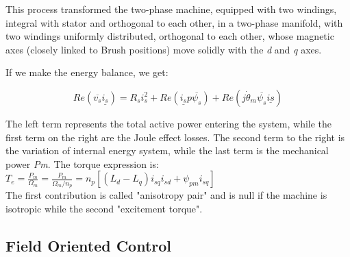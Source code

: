 \documentclass[12pt]{article}
\begin{document}
This process transformed the two-phase machine, equipped with two windings, integral with stator and orthogonal to each other, in a two-phase manifold, with two windings uniformly distributed, orthogonal to each other, whose magnetic axes (closely linked to
Brush positions) move solidly with the \textit{d} and \textit{q} axes.


If we make the energy balance, we get:

\begin{equation}
Re(\overline{v_{s}}\underline{i_{s}})=R_{s}i^{2}_{s}+Re(\underline{i_{s}}p\overline{\psi_{s}})+Re(j\dot{\theta}_{m}\overline{\psi_{s}}\underline{i{s}})
\end{equation}

The left term represents the total active power entering the system, while the first term on the right are the Joule effect losses. The second term to the right is the variation of internal energy system, while the last term is the mechanical power \textit{Pm}.
The torque expression is: \\

 $T_{e}=\frac{P_{m}}{\Omega_{m}}=\frac{P_{m}}{\Omega_{m}/n_{p}}=n_{p}[(L_{d}-L_{q})i_{sq}i_{sd}+\psi_{pm}i_{sq}]$\\

The first contribution is called "anisotropy pair" and is null if the machine is isotropic while the second "excitement torque".

\subsection{Field Oriented Control}
\end{document}
